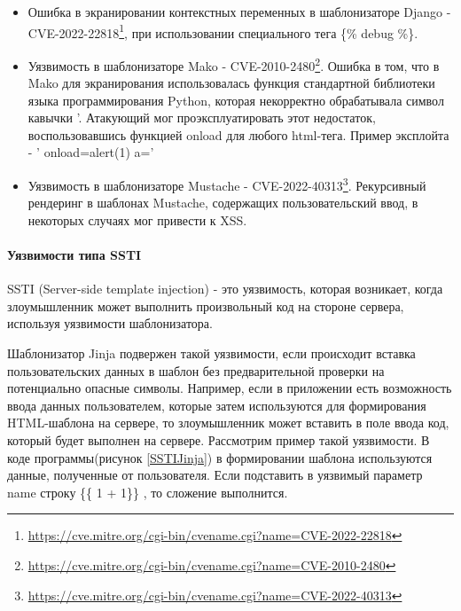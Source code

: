 \documentclass[a4paper]{article}
\begin{document}
\begin{itemize}
\item Ошибка в экранировании контекстных переменных в шаблонизаторе Django - CVE-2022-22818\footnote{\href{https://cve.mitre.org/cgi-bin/cvename.cgi?name=CVE-2022-22818}{https://cve.mitre.org/cgi-bin/cvename.cgi?name=CVE-2022-22818}}, при использовании специального тега \{\% debug \%\}.

\item Уязвимость в шаблонизаторе Mako - CVE-2010-2480\footnote{\href{https://cve.mitre.org/cgi-bin/cvename.cgi?name=CVE-2010-2480}{https://cve.mitre.org/cgi-bin/cvename.cgi?name=CVE-2010-2480}}. Ошибка в том, что в Mako для экранирования использовалась функция стандартной библиотеки языка программирования Python, которая некорректно обрабатывала символ кавычки '.  Атакующий мог проэксплуатировать этот недостаток, воспользовавшись функцией onload для любого html-тега. Пример эксплойта - ' onload=alert(1) a='
\item Уязвимость в шаблонизаторе Mustache - CVE-2022-40313\footnote{\href{https://cve.mitre.org/cgi-bin/cvename.cgi?name=CVE-2022-40313}{https://cve.mitre.org/cgi-bin/cvename.cgi?name=CVE-2022-40313}}. Рекурсивный рендеринг в шаблонах Mustache, содержащих пользовательский ввод, в некоторых случаях мог привести к XSS.
\end{itemize}

\paragraph{Уязвимости типа SSTI}
\indent

SSTI (Server-side template injection) - это уязвимость, которая возникает, когда злоумышленник может выполнить произвольный код на стороне сервера, используя уязвимости шаблонизатора.

Шаблонизатор Jinja подвержен такой уязвимости, если происходит вставка пользовательских данных в шаблон без предварительной проверки на потенциально опасные символы. Например, если в приложении есть возможность ввода данных пользователем, которые затем используются для формирования HTML-шаблона на сервере, то злоумышленник может вставить в поле ввода код, который будет выполнен на сервере. Рассмотрим пример такой уязвимости. В коде программы(рисунок \ref{SSTIJinja}) в формировании шаблона используются данные, полученные от пользователя. Если подставить в уязвимый параметр name строку \{\{ 1 + 1\}\} , то сложение выполнится. 
\end{document}
